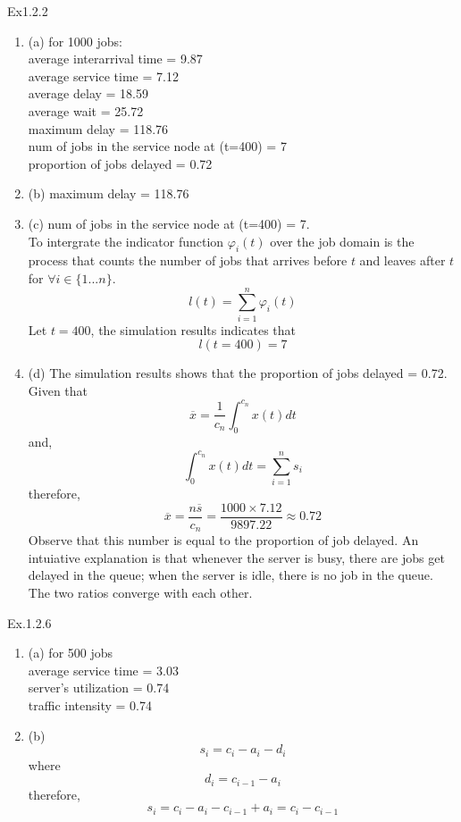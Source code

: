 \documentclass[11pt]{article}
\theoremstyle{definition}
\begin{document}
\begin{enumerate}[leftmargin=0pt, itemsep=3ex]

    \problemitem Ex1.2.2
        \begin{enumerate}
        \item (a) for 1000 jobs:
   \\ average interarrival time = 9.87
   \\ average service time = 7.12
   \\ average delay = 18.59
   \\ average wait = 25.72
   \\ maximum delay = 118.76
   \\ num of jobs in the service node at (t=400) = 7
   \\ proportion of jobs delayed = 0.72
    
    \item (b) maximum delay = 118.76
    \item (c) num of jobs in the service node at (t=400) = 7.
    \\To intergrate the indicator function $\varphi_i(t)$ over the job domain is the process that counts the number of jobs  that arrives before $t$ and leaves after $t$ for $\forall i \in \{1...n\}$.
    $$l(t) = \sum_{i=1}^{n} \varphi_i(t)$$ Let $t=400$, the simulation results indicates that $$l(t=400) = 7$$ 
    \item (d) The simulation results shows that the proportion of jobs delayed = 0.72. Given that $$\overline{x} = \frac{1}{c_n} \int_{0}^{c_n}x(t)dt$$
    and, $$\int_{0}^{c_n}x(t)dt = \sum_{i=1}^{n}s_i$$
    therefore, $$\overline{x} = \frac{n \overline{s}}{c_n} = \frac{1000 \times 7.12}{9897.22} \approx 0.72$$
    Observe that this number is equal to the proportion of job delayed. An intuiative explanation is that whenever the server is busy, there are jobs get delayed in the queue; when the server is idle, there is no job in the queue.
    The two ratios converge with each other.
    
    \end{enumerate}

    \problemitem Ex.1.2.6
    
    \begin{enumerate}
        \item (a)
        for 500 jobs
        \\average service time = 3.03
        \\server's utilization = 0.74
        \\traffic intensity = 0.74
        \item (b)   
        $$
        s_i = c_i - a_i - d_i
        $$
        where
        $$
        d_i = c_{i-1} - a_i
        $$
        therefore,
        $$
        s_i = c_i - a_i - c_{i-1} + a_i = c_i - c_{i-1}
        $$
    \end{enumerate}


\end{enumerate}
\end{document}
